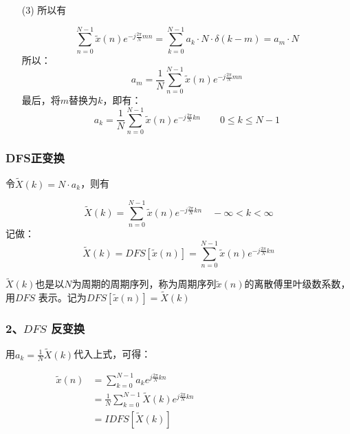 \documentclass[notheorems,compress,mathserif,table]{beamer}
\begin{document}
\begin{frame}[allowframebreaks]
\newpage
\begin{enumerate}
\item [(3)] 所以有

$$\sum_{n=0}^{N-1}\tilde{x}(n)e^{-j\frac{2\pi}{N}mn}=\sum_{k=0}^{N-1}a_{k}\cdot N\cdot \delta(k-m)
= a_{m}\cdot N $$
所以：
$$a_{m} = \frac{1}{N}\sum_{n=0}^{N-1}\tilde{x}(n)e^{-j\frac{2\pi}{N}mn}$$
最后，将$m$替换为$k$，即有：
$$a_{k} = \frac{1}{N}\sum_{n=0}^{N-1}\tilde{x}(n)e^{-j\frac{2\pi}{N}kn}\quad\quad 0\leqslant k\leqslant N-1$$
\end{enumerate}
\end{frame}


\begin{frame}[shrink]\frametitle{DFS正变换}%
令$\tilde{X}(k)=N\cdot a_{k}$，则有

$$
\tilde{X}(k) = \sum_{n=0}^{N-1}\tilde{x}(n)e^{-j\frac{2\pi}{N}kn}\quad-\infty<k<\infty
$$
记做：
\begin{equation*}
\tilde{X}(k) = DFS[\tilde{x}(n)]
= \sum_{n=0}^{N-1}\tilde{x}(n)e^{-j\frac{2\pi}{N}kn}%
\end{equation*}

$\tilde{X}(k)$也是以$N$为周期的周期序列，称为周期序列$\tilde{x}(n)$的离散傅里叶级数系数，用$DFS$ 表示。记为$DFS[\tilde{x}(n)]=\tilde{X}(k)$
\end{frame}
%


\begin{frame}[shrink]\frametitle{2、$DFS$ 反变换}%

用$a_k = \frac{1}{N}\tilde{X}(k)$代入上式，可得：

\begin{equation*}%
\begin{split}
\tilde{x}(n)
&= \sum_{k=0}^{N-1}a_{k}e^{j\frac{2\pi}{N}kn} \qquad \qquad\qquad\qquad\qquad\qquad\qquad\\
&= \frac{1}{N}\sum_{k=0}^{N-1}\tilde{X}(k)e^{j\frac{2\pi}{N}kn}  \\
&= IDFS[\tilde{X}(k)]
\end{split}
\end{equation*}


\end{frame}
\end{document}
